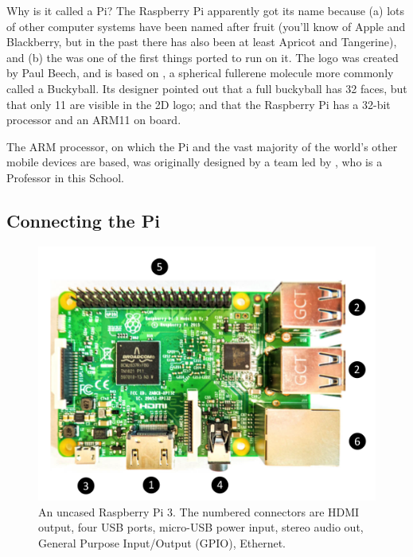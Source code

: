 \begin{rpi}{Why is it called a Pi?}
  The Raspberry Pi apparently got its name because (a) lots of other computer systems have been named after fruit (you'll know of Apple and Blackberry, but in the past there has also been at least Apricot and Tangerine), and (b) the  was one of the first things ported to run on it. The logo was created by Paul Beech, and is based on , a spherical fullerene molecule more commonly called a Buckyball. Its designer pointed out that a full buckyball has 32 faces, but that only 11 are visible in the 2D logo; and that the Raspberry Pi has a 32-bit processor and an ARM11 on board.

The ARM processor, on which the Pi and the vast majority of the world's other mobile devices are based, was originally designed by a team led by , who is a Professor in this School.
\end{rpi}

\subsection{Connecting the Pi}
\label{sec:connecting-pi}

\begin{figure}
\centerline{\includegraphics[width=15cm]{images/pi3top}}
\caption{An uncased Raspberry Pi 3. The numbered connectors are \protect{} HDMI output,  \protect{} four USB ports,  \protect{} micro-USB power input,  \protect{} stereo audio out,  \protect{} General Purpose Input/Output (GPIO),  \protect{} Ethernet.}\label{figure:bare-rpi}
\end{figure}

